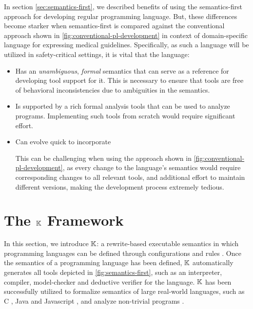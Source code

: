 In section \ref{sec:semantics-first}, we described benefits
of using the semantics-first approach for developing regular programming
language. But, these differences become starker when semantics-first
is compared against the conventional approach shown in \autoref{fig:conventional-pl-development} in context of domain-specific language for
expressing medical guidelines. Specifically, as such a language will be utilized
in safety-critical settings, it is vital that the language:
\begin{itemize}
  \item Has an \emph{unambiguous}, \emph{formal}
    semantics that can serve as a reference for developing tool support for it.
    This is necessary to ensure that
    tools are free of behavioral inconsistencies due to ambiguities in the
    semantics.
  \item Is supported by a rich formal analysis tools that can
    be used to analyze programs.
    Implementing such tools from scratch would require significant effort.
  \item Can evolve quick to incorporate
    This can be challenging when using the approach shown in \autoref{fig:conventional-pl-development}, as
    every change to the language's semantics would require corresponding
    changes to all relevant tools, and additional effort to maintain
    different versions, making the development process extremely tedious.
\end{itemize}

\section{The $\mathbb{K}{}$ Framework}\label{sec:k-framework}

In this section, we introduce $\mathbb{K}{}$: a rewrite-based executable semantics
in which programming languages can be defined through configurations and rules
\cite{KframeworkUrl}. Once the semantics of a programming language has been
defined, $\mathbb{K}{}$ automatically generates all tools depicted in \autoref{fig:semantics-first}, such as an interpreter, compiler,
model-checker and deductive verifier for the language. $\mathbb{K}{}$ has been successfully
utilized to formalize semantics of large real-world languages, such as
C \cite{HathhornPLDI15}, Java \cite{BogdanasPOPL15} and
Javascript \cite{ParkPLDI15}, and analyze non-trivial programs
\cite{StefanescuOOPSLA16,ParkFSE18}.

